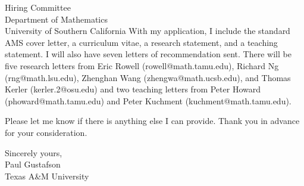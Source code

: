 \documentclass[11pt]{letter} %
\begin{document}
\begin{letter}{Hiring Committee \\
Department of Mathematics \\
University of Southern California}
With my application, I include the standard AMS cover letter, a curriculum
vitae, a research statement, and a teaching statement. I will also have seven
letters of recommendation sent. There will be five research letters from
Eric Rowell (rowell@math.tamu.edu),  Richard Ng (rng@math.lsu.edu), Zhenghan Wang (zhengwa@math.ucsb.edu), and Thomas Kerler (kerler.2@osu.edu) and two teaching letters from Peter Howard (phoward@math.tamu.edu) and Peter Kuchment (kuchment@math.tamu.edu).

Please let me know if there is anything else I can provide. Thank you in
advance for your consideration.

\closing{Sincerely yours,\\ Paul Gustafson \\ Texas A\&M University}




\end{letter}
\end{document}
